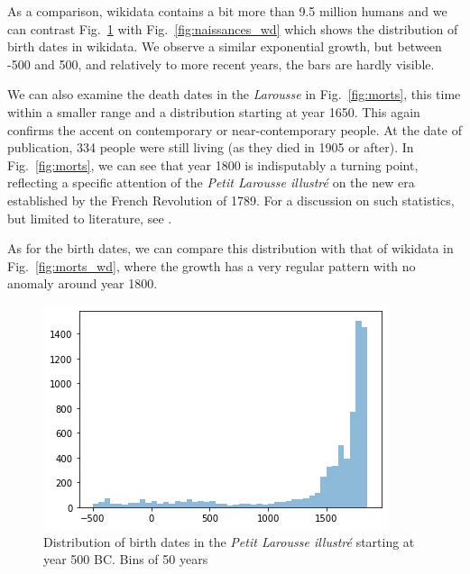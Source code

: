 \documentclass[10pt, a4paper]{article}
\begin{document}
As a comparison, wikidata contains a bit more than 9.5 million humans and we can contrast Fig.~\ref{fig:naissances} with Fig.~\ref{fig:naissances_wd} which shows the distribution of birth dates in wikidata. We observe a similar exponential growth, but between -500 and 500, and relatively to more recent years, the bars are hardly visible.

We can also examine the death dates in the \textit{Larousse} in Fig.~\ref{fig:morts}, this time within a smaller range and a distribution starting at year 1650. This again confirms the accent on contemporary or near-contemporary people. At the date of publication, 334 people were still living (as they died in 1905 or after). In Fig.~\ref{fig:morts}, we can see that year 1800 is indisputably a turning point, reflecting a specific attention of the \textit{Petit Larousse illustré} on the new era established by the French Revolution of 1789. For a discussion on such statistics, but limited to literature, see .

As for the birth dates, we can compare this distribution with that of wikidata in Fig.~\ref{fig:morts_wd}, where the growth has a very regular pattern with no anomaly around year 1800.

\begin{figure}[t]
\centering
\includegraphics[width=\columnwidth]{img/naissances.png} 
\caption{Distribution of birth dates in the \textit{Petit Larousse illustré} starting at year 500 BC. Bins of 50 years}
\label{fig:naissances}
\end{figure}
\end{document}
